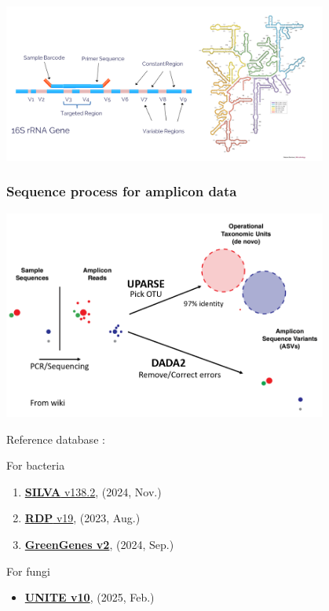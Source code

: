 \documentclass[
]{article}
\providecommand{\tightlist}{%
  \setlength{\itemsep}{0pt}\setlength{\parskip}{0pt}}
\begin{document}
\includegraphics[width=0.8\textwidth,height=\textheight]{images/Fig3.png}

\hypertarget{sequence-process-for-amplicon-data}{%
\subsubsection{Sequence process for amplicon
data}\label{sequence-process-for-amplicon-data}}

\includegraphics[width=0.8\textwidth,height=\textheight]{images/Fig4.png}

Reference database :

For bacteria

\begin{enumerate}
\def\labelenumi{\arabic{enumi}.}
\item
  \href{https://www.arb-silva.de/}{\textbf{SILVA} v138.2}, (2024, Nov.)
\item
  \href{https://zenodo.org/records/14168771}{\textbf{RDP} v19}, (2023,
  Aug.)
\item
  \href{https://www.nature.com/articles/s41587-023-01845-1}{\textbf{GreenGenes
  v2}}, (2024, Sep.)
\end{enumerate}

For fungi

\begin{itemize}
\tightlist
\item
  \href{https://unite.ut.ee/repository.php}{\textbf{UNITE v10}}, (2025,
  Feb.)
\end{itemize}
\end{document}
